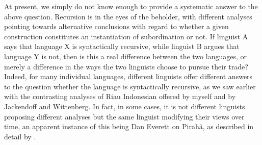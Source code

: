\documentclass[output=paper,colorlinks,citecolor=brown
]{langscibook}
\begin{document}
At present, we simply do not know enough to provide a systematic answer to the above question.  Recursion is in the eyes of the beholder, with different analyses pointing towards alternative conclusions with regard to whether a given construction constitutes an instantiation of subordination or not.  If linguist A says that language X is syntactically recursive, while linguist B argues that language Y is not, then is this a real difference between the two languages, or merely a difference in the ways the two linguists choose to pursue their trade?  Indeed, for many individual languages, different linguists offer different answers to the question whether the language is syntactically recursive, as we saw earlier with the contrasting analyses of Riau Indonesian offered by myself and by Jackendoff and Wittenberg. In fact, in some cases, it is not different linguists proposing different analyses but the same linguist modifying their views over time, an apparent instance of this being Dan Everett on Pirahã, as described in detail by .
\end{document}
